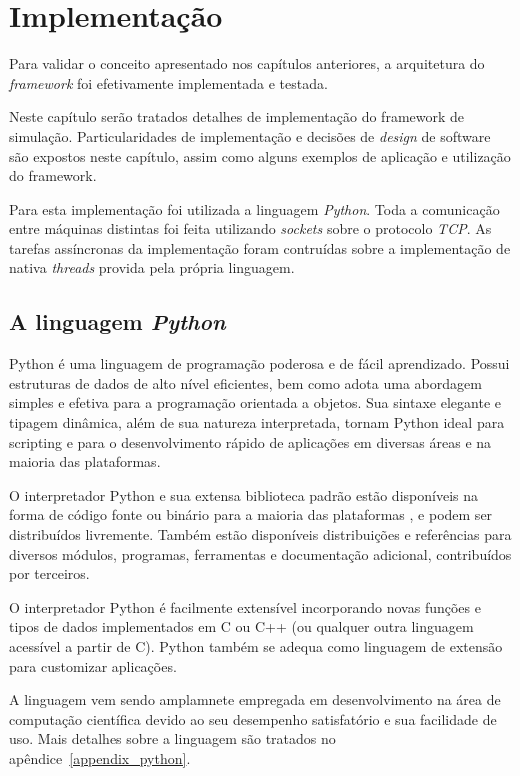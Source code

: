 \chapter{Implementação}

Para validar o conceito apresentado nos capítulos anteriores, a arquitetura do \textit{framework} foi efetivamente implementada e testada.

Neste capítulo serão tratados detalhes de implementação do framework de simulação. Particularidades de implementação e decisões de \textit{design} de software são expostos neste capítulo, assim como alguns exemplos de aplicação e utilização do framework.

Para esta implementação foi utilizada a linguagem \textit{Python}. Toda a comunicação entre máquinas distintas foi feita utilizando \textit{sockets} sobre o protocolo \textit{TCP}. As tarefas assíncronas da implementação foram contruídas sobre a implementação de nativa \textit{threads} provida pela própria linguagem.

\section{A linguagem \emph{Python}}

Python é uma linguagem de programação poderosa e de fácil aprendizado. Possui estruturas de dados de alto nível eficientes, bem como adota uma abordagem simples e efetiva para a programação orientada a objetos. Sua sintaxe elegante e tipagem dinâmica, além de sua natureza interpretada, tornam Python ideal para scripting e para o desenvolvimento rápido de aplicações em diversas áreas e na maioria das plataformas.

O interpretador Python e sua extensa biblioteca padrão estão disponíveis na forma de código fonte ou binário para a maioria das plataformas \cite{PYTHONSITE}, e podem ser distribuídos livremente. Também estão disponíveis distribuições e referências para diversos módulos, programas, ferramentas e documentação adicional, contribuídos por terceiros.

O interpretador Python é facilmente extensível incorporando novas funções e tipos de dados implementados em C ou C++ (ou qualquer outra linguagem acessível a partir de C). Python também se adequa como linguagem de extensão para customizar aplicações.

A linguagem vem sendo amplamnete empregada em desenvolvimento na área de computação científica devido ao seu desempenho satisfatório e sua facilidade de uso. Mais detalhes sobre a linguagem são tratados no apêndice~\ref{appendix_python}.

